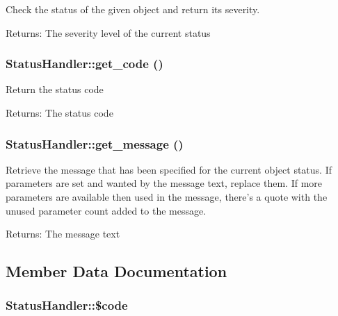 Check the status of the given object and return its severity.

\begin{Desc}
\item[Returns:]The severity level of the current status \end{Desc}
\hypertarget{classStatusHandler_d39bc4e6a56b6d418a252957da9b4417}{
\subsubsection{\setlength{\rightskip}{0pt plus 5cm}StatusHandler::get\_\-code ()}}
\label{classStatusHandler_d39bc4e6a56b6d418a252957da9b4417}


Return the status code

\begin{Desc}
\item[Returns:]The status code \end{Desc}
\hypertarget{classStatusHandler_79170bca79bfd82e3f707e1294e7c916}{
\subsubsection{\setlength{\rightskip}{0pt plus 5cm}StatusHandler::get\_\-message ()}}
\label{classStatusHandler_79170bca79bfd82e3f707e1294e7c916}


Retrieve the message that has been specified for the current object status. If parameters are set and wanted by the message text, replace them. If more parameters are available then used in the message, there's a quote with the unused parameter count added to the message.

\begin{Desc}
\item[Returns:]The message text \end{Desc}


\subsection{Member Data Documentation}
\hypertarget{classStatusHandler_b74e826d2401345eb20b11fe7d78aa45}{
\subsubsection{\setlength{\rightskip}{0pt plus 5cm}StatusHandler::\$code}}
\label{classStatusHandler_b74e826d2401345eb20b11fe7d78aa45}


